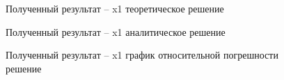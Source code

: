 \documentclass[12pt]{article}
\begin{document}
\begin{figure}[h]
	\caption{Полученный результат -- x1 теоретическое решение}
\end{figure}

\begin{figure}[h]
	\caption{Полученный результат -- x1 аналитическое решение}
\end{figure}

\begin{figure}[h]
	\caption{Полученный результат -- x1 график относительной погрешности решение}
\end{figure}
		\clearpage
\end{document}
